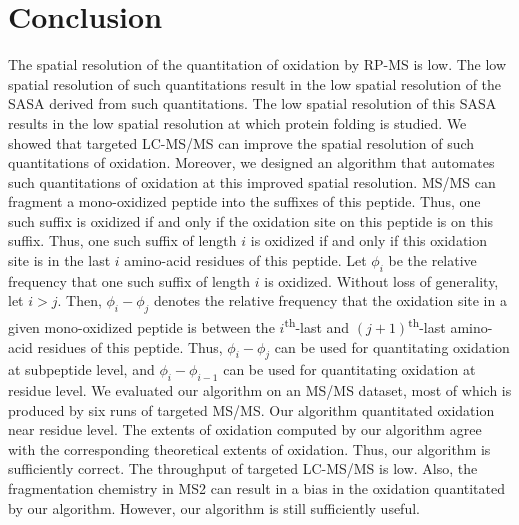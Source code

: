 
\glsunsetall
\chapter{Conclusion}
\label{chap:concl}
\glsresetall

The spatial resolution of the quantitation of oxidation by \gls{RP-MS} is low. 
The low spatial resolution of such quantitations result in the low spatial resolution of the \gls{SASA} derived from such quantitations.
The low spatial resolution of this \gls{SASA} results in the low spatial resolution at which protein folding is studied.
We showed that targeted \gls{LC-MS/MS} can improve the spatial resolution of such quantitations of oxidation.
Moreover, we designed an algorithm that automates such quantitations of oxidation at this improved spatial resolution.
\Gls{MS/MS} can fragment a \gls{mono-oxidized} peptide into the suffixes of this peptide.
Thus, one such suffix is oxidized if and only if the oxidation site on this peptide is on this suffix.
Thus, one such suffix of length \(i\) is oxidized if and only if this oxidation site is in the last \(i\) amino-acid residues of this peptide.
Let \(\phi_i\) be the relative frequency that one such suffix of length \(i\) is oxidized.
Without loss of generality, let \(i>j\).
Then, \(\phi_i - \phi_{j}\) denotes the relative frequency that the oxidation site in a given \gls{mono-oxidized} peptide is between the \(i\)\textsuperscript{th}-last and \((j+1)\)\textsuperscript{th}-last amino-acid residues of this peptide.
Thus, \(\phi_i - \phi_{j}\) can be used for quantitating oxidation at subpeptide level,
	and \(\phi_i - \phi_{i-1}\) can be used for quantitating oxidation at residue level.
We evaluated our algorithm on an \gls{MS/MS} dataset, most of which is produced by six runs of targeted \gls{MS/MS}.
Our algorithm quantitated oxidation near residue level.
The extents of oxidation computed by our algorithm agree with the corresponding theoretical extents of oxidation.
Thus, our algorithm is sufficiently correct.
The throughput of targeted \gls{LC-MS/MS} is low.
Also, the fragmentation chemistry in \gls{MS2} can result in a bias in the oxidation quantitated by our algorithm.
However, our algorithm is still sufficiently useful.	

